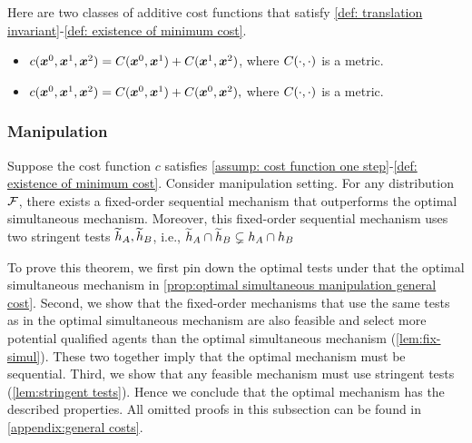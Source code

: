 Here are two classes of additive cost functions that satisfy \cref{def: translation invariant}-\ref{def: existence of minimum cost}.
\begin{itemize}
    \item  $
c(\boldsymbol{x}^0,\boldsymbol{x}^1,\boldsymbol{x}^2)= C(\boldsymbol{x}^0,\boldsymbol{x}^1) + C(\boldsymbol{x}^1,\boldsymbol{x}^2) 
$, where $C(\cdot,\cdot)$ is a metric.
    \item $
c(\boldsymbol{x}^0,\boldsymbol{x}^1,\boldsymbol{x}^2) =C(\boldsymbol{x}^0,\boldsymbol{x}^1) + C(\boldsymbol{x}^0,\boldsymbol{x}^2),
 $ where  $C(\cdot,\cdot)$ is a metric.
\end{itemize}



\subsubsection{Manipulation}\label{subsubsec: general cost manipulation}


\begin{proposition}\label{thm:opt_manipulation}
    Suppose the cost function $c$ satisfies \cref{assump: cost function one step}-\ref{def: existence of minimum cost}.
    Consider manipulation setting.
    For any distribution $\mathcal{F}$, there exists a fixed-order sequential mechanism that outperforms the optimal simultaneous mechanism. Moreover, this fixed-order sequential mechanism 
    uses two stringent tests $\widetilde{h}_A, \widetilde{h}_B$, i.e., $\widetilde{h}_A\cap \widetilde{h}_B \subsetneq h_A\cap h_B$
\end{proposition}


To prove this theorem, we first pin down the optimal tests under that the optimal simultaneous mechanism in \cref{prop:optimal simultaneous manipulation general cost}.
Second, we show that the fixed-order mechanisms that use the same tests as in the optimal simultaneous mechanism are also feasible 
 and select more potential qualified agents than the optimal simultaneous mechanism (\cref{lem:fix-simul}).
These two together imply that the optimal mechanism must be sequential.
Third, we show that any feasible mechanism must use stringent tests (\cref{lem:stringent tests}).
Hence we conclude that the optimal mechanism has the described properties.
All omitted proofs in this subsection can be found in \cref{appendix:general costs}.



